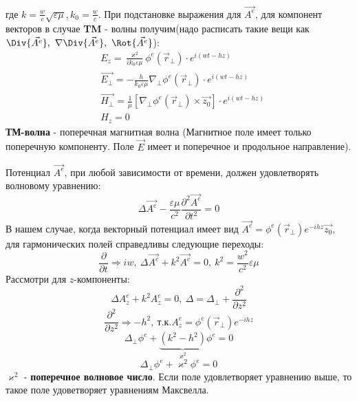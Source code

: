 где $k = \frac{w}{c}\sqrt{\varepsilon\mu}, k_0 = \frac{w}{c}$. При подстановке выражения для $\vec{A^e}$, для компонент
векторов в случае \textbf{TM} - волны получим(надо расписать такие вещи как $\Div{\vec{A^e}},~ \nabla \Div{\vec{A^e}},~\Rot{\vec{A^e}}$):
\begin{align*}
  &E_z = \frac{\varkappa^2}{ik_0\varepsilon\mu} \phi^e(\vec{r}_{\perp})\cdot e^{i(wt-hz)}\\
  &\vec{E_{\perp}} = -\frac{h}{k_0\varepsilon\mu}\nabla_{\perp} \phi^e(\vec{r}_{\perp})\cdot e^{i(wt-hz)}\\
  &\vec{H_{\perp}} = \frac{1}{\mu}[\nabla_{\perp} \phi^e(\vec{r}_{\perp})\times\vec{z_0}]\cdot e^{i(wt-hz)}\\
  &H_z = 0
\end{align*}
\textbf{ТМ-волна} - поперечная магнитная волна (Магнитное поле имеет только поперечную компоненту. Поле $\vec{E}$ имеет и поперечное и
продольное направление). 

Потенциал $\vec{A^e}$, при любой зависимости от времени, должен удовлетворять волновому уравнению:
\begin{equation}
  \Delta \vec{A^e} - \frac{\varepsilon\mu}{c^2} \frac{\partial^2\vec{A^e}}{\partial t^2} = 0
\end{equation}
В нашем случае, когда векторный потенциал имеет вид $\vec{A^e} = \phi^e(\vec{r}_{\perp})e^{-ihz}\vec{z_0}$, для
гармонических полей справедливы следующие переходы:
\begin{equation}
  \frac{\partial}{\partial t} \Rightarrow iw,~ \Delta \vec{A^e} + k^2 \vec{A^e} =0,~ k^2 = \frac{w^2}{c^2}\varepsilon\mu
\end{equation}
Рассмотри для $z$-компоненты:
\begin{equation}
  \Delta A^e_z + k^2 A^e_z =0,~ \Delta = \Delta_{\perp} + \frac{\partial^2}{\partial z^2}
\end{equation}
\begin{equation}
  \frac{\partial^2}{\partial z^2} \Rightarrow -h^2,~ \text{т.к.} A^e_z = \phi^e(\vec{r}_{\perp})e^{-ihz}
\end{equation}
\begin{equation}
  \Delta_{\perp}\phi^e+\underbrace{(k^2-h^2)}_{\varkappa^2}\phi^e=0
\end{equation}
\begin{equation}
  \Delta_{\perp}\phi^e+\varkappa^2\phi^e=0
\end{equation}
$\varkappa^2$ - \textbf{поперечное волновое число}. Если поле удовлетворяет уравнению выше, то такое поле удоветворяет
уравнениям Максвелла.


